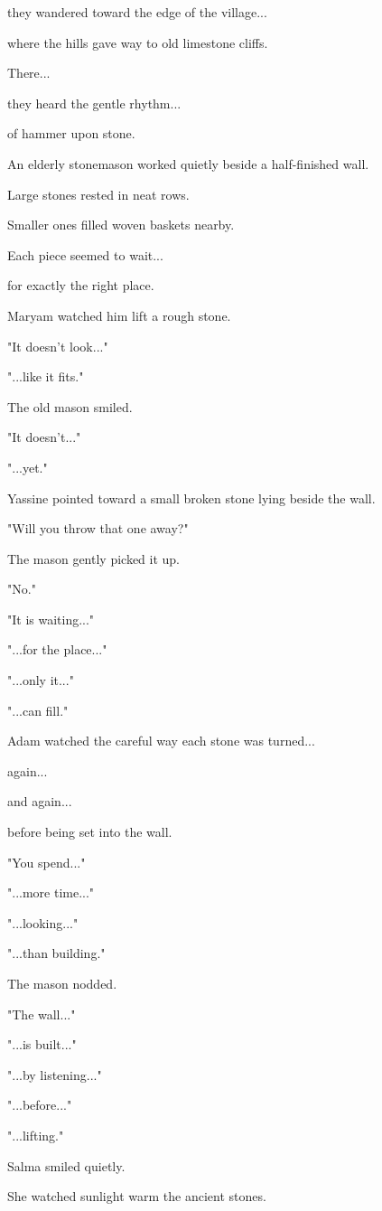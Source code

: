 \documentclass[12pt,openany]{book}
\begin{document}
they wandered toward the edge of the village...

where the hills gave way to old limestone cliffs.

There...

they heard the gentle rhythm...

of hammer upon stone.

An elderly stonemason worked quietly beside a half-finished wall.

Large stones rested in neat rows.

Smaller ones filled woven baskets nearby.

Each piece seemed to wait...

for exactly the right place.

Maryam watched him lift a rough stone.

"It doesn't look..."

"...like it fits."

The old mason smiled.

"It doesn't..."

"...yet."

Yassine pointed toward a small broken stone lying beside the wall.

"Will you throw that one away?"

The mason gently picked it up.

"No."

"It is waiting..."

"...for the place..."

"...only it..."

"...can fill."

Adam watched the careful way each stone was turned...

again...

and again...

before being set into the wall.

"You spend..."

"...more time..."

"...looking..."

"...than building."

The mason nodded.

"The wall..."

"...is built..."

"...by listening..."

"...before..."

"...lifting."

Salma smiled quietly.

She watched sunlight warm the ancient stones.
\end{document}
